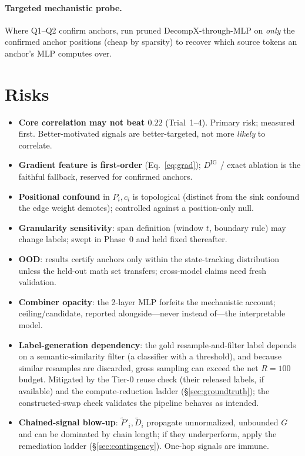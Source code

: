 \documentclass[11pt]{article}
\begin{document}
\paragraph{Targeted mechanistic probe.} Where Q1--Q2 confirm anchors, run pruned DecompX-through-MLP
\cite{modarressi2023decompx} on \emph{only} the confirmed anchor positions (cheap by sparsity) to
recover which source tokens an anchor's MLP computes over.

\section{Risks}
\begin{itemize}[leftmargin=1.4em,itemsep=2pt]
\item \textbf{Core correlation may not beat $0.22$} (Trial~1--4). Primary risk; measured first.
Better-motivated signals are better-targeted, not more \emph{likely} to correlate.
\item \textbf{Gradient feature is first-order} (Eq.~\ref{eq:grad}); $D^{\mathrm{IG}}$ / exact ablation
is the faithful fallback, reserved for confirmed anchors.
\item \textbf{Positional confound} in $P_i,c_i$ is topological (distinct from the sink confound the
edge weight demotes); controlled against a position-only null.
\item \textbf{Granularity sensitivity}: span definition (window $t$, boundary rule) may change labels; swept
in Phase~0 and held fixed thereafter.
\item \textbf{OOD}: results certify anchors only within the state-tracking distribution unless the
held-out math set transfers; cross-model claims need fresh validation.
\item \textbf{Combiner opacity}: the 2-layer MLP forfeits the mechanistic account;
ceiling/candidate, reported alongside---never instead of---the interpretable model.
\item \textbf{Label-generation dependency}: the gold resample-and-filter label depends on a
semantic-similarity filter (a classifier with a threshold), and because similar resamples are
discarded, gross sampling can exceed the net $R{=}100$ budget. Mitigated by the Tier-0 reuse check
(their released labels, if available) and the compute-reduction ladder (\S\ref{sec:groundtruth}); the
constructed-swap check validates the pipeline behaves as intended.
\item \textbf{Chained-signal blow-up}: $\widetilde P'_i,\widetilde D_i$ propagate unnormalized,
unbounded $G$ and can be dominated by chain length; if they underperform, apply the remediation ladder
(\S\ref{sec:contingency}). One-hop signals are immune.
\end{itemize}
\end{document}
